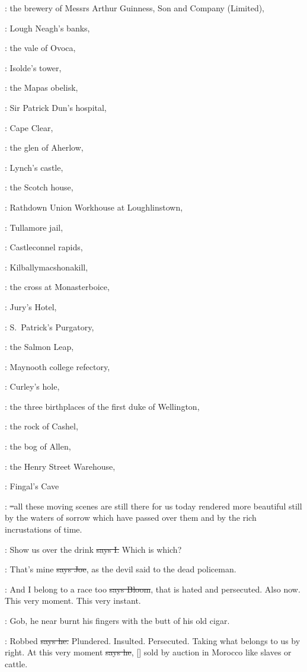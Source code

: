 :
the brewery of Messrs Arthur Guinness,
Son and Company (Limited),

:
Lough Neagh's banks,

:
the vale of Ovoca,

:
Isolde's tower,

:
the Mapas obelisk,

:
Sir Patrick Dun's hospital,

:
Cape Clear,

:
the glen of Aherlow,

:
Lynch's castle,

:
the Scotch house,

:
Rathdown Union Workhouse at Loughlinstown,

:
Tullamore jail,

:
Castleconnel rapids,

:
Kilballymacshonakill,

:
the cross at Monasterboice,

:
Jury's Hotel,

:
S.~Patrick's Purgatory,

:
the Salmon Leap,

:
Maynooth college refectory,

:
Curley's hole,

:
the three birthplaces of the first duke of Wellington,

:
the rock of Cashel,

:
the bog of Allen,

:
the Henry Street Warehouse,

:
Fingal's Cave

:
\sout{--}all these moving scenes are still there for us
today rendered more beautiful still by the waters of sorrow which have
passed over them and by the rich incrustations of time.

:
Show us over the drink
\sout{says I.}
Which is which?

\joe:
That's mine
\sout{says Joe},
as the devil said to the dead policeman.

\Bloom:
And I belong to a race too
\sout{says Bloom},
that is hated and persecuted.
Also now.
This very moment.
This very instant.

\Nq:
Gob,
he near burnt his fingers with the butt of his old cigar.

\Bloom:
Robbed
\sout{says he.}
Plundered.
Insulted.
Persecuted.
Taking what belongs to us by right.
At this very moment
\sout{says he},
[]
sold by auction in Morocco like slaves or cattle.

